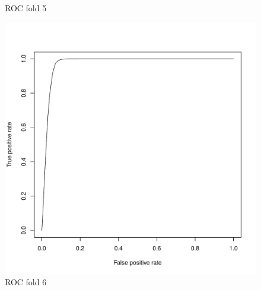 \documentclass{article}\usepackage[]{graphicx}\usepackage[]{color}
\begin{document}
\begin{figure}[h]
  \caption{ROC fold 5}\label{}
\endminipage\hfill
{}%
  \includegraphics[width=\linewidth]{ROC_block6.pdf}
  \caption{ROC fold 6}\label{}
\endminipage
\end{figure}
\end{document}
